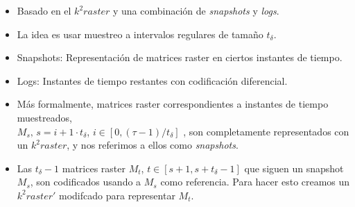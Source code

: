 \documentclass{article}
\begin{document}
\begin{itemize}
  \item Basado en el $k^2raster$ y una combinación de \emph{snapshots} y
    \emph{logs}.
  \item La idea es usar muestreo a intervalos regulares de tamaño $t_\delta$.
  \item Snapshots: Representación de matrices raster en ciertos instantes de
    tiempo.
  \item Logs: Instantes de tiempo restantes con codificación diferencial.
  \item Más formalmente, matrices raster correspondientes a instantes de tiempo
    muestreados,\\
    $M_s \text{,  }s = i + 1 \cdot t_\delta$,  $i \in [0, (\tau - 1) / t_\delta]$
    , son completamente representados con un $k^2raster$, y nos referimos a ellos
    como \emph{snapshots}.
  \item Las $t_\delta - 1$ matrices raster $M_t$, $t \in [s+1, s+t_\delta-1]$
    que siguen  un snapshot $M_s$, son codificados usando a $M_s$ como
    referencia. Para hacer esto creamos un $k^2raster'$ modifcado para
    representar $M_t$.
\end{itemize}
\end{document}
